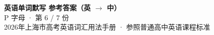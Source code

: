 \documentclass[10pt,a4paper]{article}
\begin{document}
\pagestyle{plain}

\begin{center}
{\LARGE\bfseries 英语单词默写 \quad 参考答案（英 $\to$ 中）}\\[0.22em]
{\large P 字母 · 第 6 / 7 份}\\[0.18em]
{\small 2026年上海市高考英语词汇用法手册 · 参照普通高中英语课程标准}
\end{center}

\vspace{0.2em}
\noindent{\color{rulegray}\rule{\textwidth}{0.8pt}}

\vspace{0.35em}

\vspace{0.25em}
\renewcommand{\arraystretch}{1.32}
\end{document}
